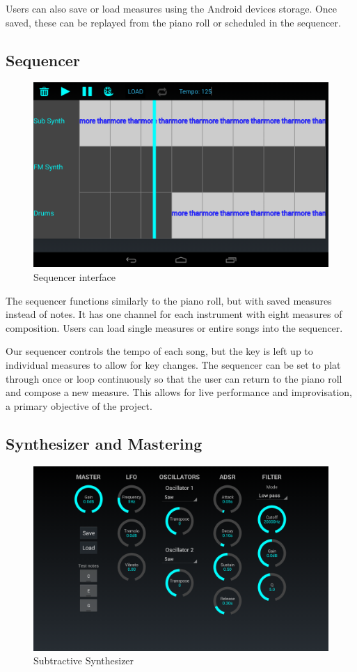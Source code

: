 \documentclass[letterpaper,12pt]{article}
\begin{document}
Users can also save or load measures using the Android devices storage. Once saved, these can be replayed from the piano roll or scheduled in the sequencer.

\subsection{Sequencer}

\begin{figure}
\centering
\includegraphics[width=.6\textwidth]{figures/sequencer.png}
\caption{Sequencer interface}
\label{fig:sequencer}
\end{figure}

The sequencer functions similarly to the piano roll, but with saved measures instead of notes. It has one channel for each instrument with eight measures of composition. Users can load single measures or entire songs into the sequencer.

Our sequencer controls the tempo of each song, but the key is left up to individual measures to allow for key changes. The sequencer can be set to plat through once or loop continuously so that the user can return to the piano roll and compose a new measure. This allows for live performance and improvisation, a primary objective of the project.

\subsection{Synthesizer and Mastering}

\begin{figure}[h]
\centering
\includegraphics[width=\textwidth]{figures/subtractivesynth.png}
\caption{Subtractive Synthesizer}
\label{fig:subtractivesynth}
\end{figure}
\end{document}
